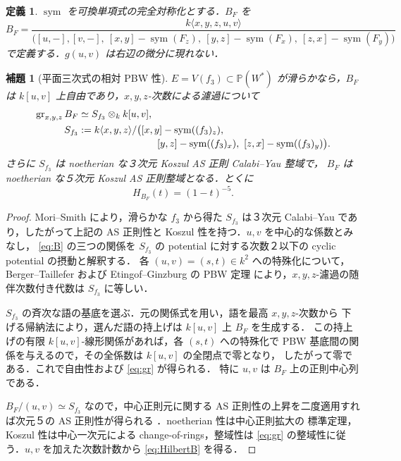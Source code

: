 \documentclass[11pt,a4paper]{ltjsarticle}
\numberwithin{equation}{section}
\newtheorem{lemma}[theorem]{補題}
\newtheorem{definition}[theorem]{定義}
\newcommand{\PP}{\mathbb P}
\newcommand{\gr}{\operatorname{gr}}
\newcommand{\Symm}{\operatorname{sym}}
\begin{document}
\begin{definition}\label{def:B}
$\Symm$ を可換単項式の完全対称化とする．$B_F$ を
\begin{equation}\label{eq:B}
 B_F=\frac{k\langle x,y,z,u,v\rangle}{
 \bigl([u,-],[v,-],\ [x,y]-\Symm(F_z),\
 [y,z]-\Symm(F_x),\ [z,x]-\Symm(F_y)\bigr)}
\end{equation}
で定義する．$g(u,v)$ は右辺の微分に現れない．
\end{definition}

\begin{lemma}[平面三次式の相対 PBW 性]\label{lem:pbw}
$E=V(f_3)\subset\PP(W^*)$ が滑らかなら，$B_F$ は
$k[u,v]$ 上自由であり，$x,y,z$-次数による濾過について
\begin{align}\label{eq:gr}
 \gr_{x,y,z}B_F&\simeq S_{f_3}\otimes_k k[u,v],\\
 S_{f_3}&:=k\langle x,y,z\rangle/\bigl([x,y]-\Symm((f_3)_z),\ 
\notag\\[-2pt]
 &\hspace{8em}[y,z]-\Symm((f_3)_x),\ [z,x]-\Symm((f_3)_y)\bigr).
\end{align}
さらに $S_{f_3}$ は noetherian な３次元 Koszul AS 正則 Calabi--Yau 整域で，
$B_F$ は noetherian な５次元 Koszul AS 正則整域となる．とくに
\begin{equation}\label{eq:HilbertB}
 H_{B_F}(t)=(1-t)^{-5}.
\end{equation}
\end{lemma}
\begin{proof}
Mori--Smith \cite[Theorem~4.2(1)]{MS} により，滑らかな $f_3$ から得た
$S_{f_3}$ は３次元 Calabi--Yau であり，したがって上記の
AS 正則性と Koszul 性を持つ．$u,v$ を中心的な係数とみなし，
\eqref{eq:B} の三つの関係を
$S_{f_3}$ の potential に対する次数２以下の cyclic potential の摂動と解釈する．
各 $(u,v)=(s,t)\in k^2$ への特殊化について，
Berger--Taillefer および Etingof--Ginzburg の PBW 定理
\cite[Proposition~7.3.1(ii)]{EG} により，$x,y,z$-濾過の随伴次数付き代数は
$S_{f_3}$ に等しい．

$S_{f_3}$ の斉次な語の基底を選ぶ．元の関係式を用い，語を最高 $x,y,z$-次数から
下げる帰納法により，選んだ語の持上げは $k[u,v]$ 上 $B_F$ を生成する．
この持上げの有限 $k[u,v]$-線形関係があれば，各 $(s,t)$ への特殊化で
PBW 基底間の関係を与えるので，その全係数は $k[u,v]$ の全閉点で零となり，
したがって零である．これで自由性および \eqref{eq:gr} が得られる．
特に $u,v$ は $B_F$ 上の正則中心列である．

$B_F/(u,v)\simeq S_{f_3}$ なので，中心正則元に関する
AS 正則性の上昇を二度適用すれば次元５の AS 正則性が得られる
\cite[Propositions~2.1, 2.3]{CKS}．noetherian 性は中心正則拡大の
標準定理，Koszul 性は中心一次元による change-of-rings，整域性は
\eqref{eq:gr} の整域性に従う．$u,v$ を加えた次数計数から \eqref{eq:HilbertB} を得る．
\end{proof}
\end{document}
